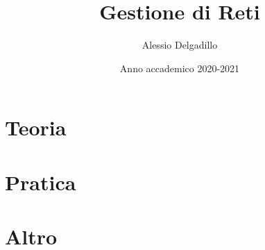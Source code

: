 \documentclass[12pt, a4paper]{report}
\title {Gestione di Reti}
\date{Anno accademico 2020-2021}
\author{Alessio Delgadillo}
\begin{document}
\maketitle
\newpage
\tableofcontents

\part{Teoria}




\part{Pratica}






\part{Altro}



\end{document}
